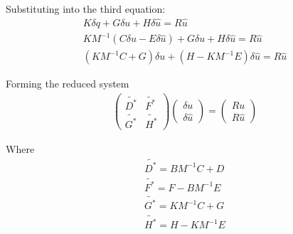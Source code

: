 \documentclass[11pt]{article}
\begin{document}
Substituting into the third equation:
\begin{align}
    K \delta q + G \delta u  + H \delta\hat{u} = R\hat{u} \\
    KM^{-1}(C \delta u  - E \delta\hat{u})+ G \delta u  + H \delta\hat{u} = R\hat{u} \\
    (KM^{-1}C + G)\delta u + (H- KM^{-1}E)\delta\hat{u} = R\hat{u}
\end{align}

Forming the reduced system
\begin{align} 
    \left( \begin{array}{cc} \tilde{D^*} & \tilde{F^*} \\ \tilde{G^*}&\tilde{H^*}  \end{array} \right) 
    \left( \begin{array}{c} \delta u \\ \delta \hat{u}   \end{array} \right) = 
    \left( \begin{array}{c} Ru  \\ R\hat{u}   \end{array} \right)
\end{align}

Where
\begin{align}
    \tilde{D^*} = BM^{-1}C +D\\
    \tilde{F^*} = F-BM^{-1}E\\
    \tilde{G^*} = KM^{-1}C + G\\
    \tilde{H^*} = H- KM^{-1}E\\
\end{align}
\end{document}
